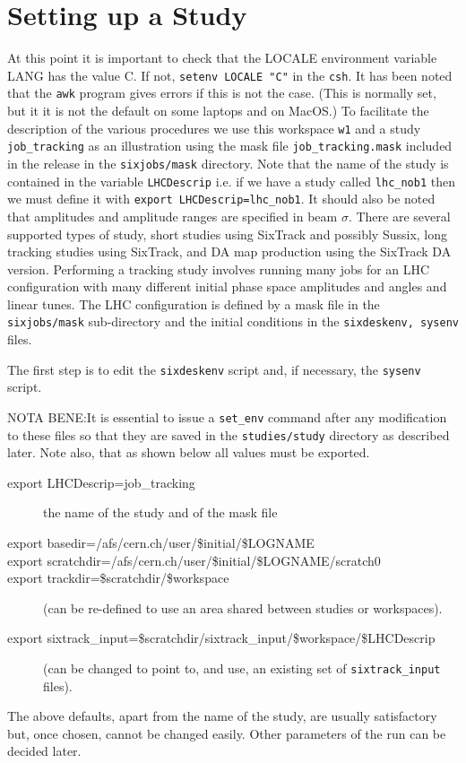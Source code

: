 \documentclass{cernatsnote}    %
\begin{document}
\section{Setting up a Study}
\label{sec:study}
At this point it is important to check that the LOCALE environment variable
LANG has the value C. If not, {\tt setenv LOCALE "C"} in the {\tt csh}.
It has been noted that the {\tt awk} program gives errors if this is not the
case. (This is normally set, but it it is not the default on some laptops
and on MacOS.)
To facilitate the description of the various procedures we use this workspace
{\tt w1} and a study {\tt job\_tracking} as an illustration using the mask
file {\tt job\_tracking.mask} included in the release in the {\tt sixjobs/mask}
directory. Note that the name of the
study is contained in the variable {\tt LHCDescrip} i.e. if we have a study
called {\tt lhc\_nob1} then we must define it 
with {\tt export LHCDescrip=lhc\_nob1}. It should also be noted that amplitudes
and amplitude ranges are specified in beam $\sigma$.
There are several supported types of study, short studies using SixTrack and possibly
Sussix, long tracking studies using SixTrack, and DA map production using the SixTrack DA version.
Performing a tracking study involves running many jobs for an LHC configuration with
many different initial phase space amplitudes and angles and linear tunes. The LHC configuration is
defined by a mask file in the {\tt sixjobs/mask} sub-directory and the initial
conditions in the {\tt sixdeskenv, sysenv} files.

The first step is to edit the {\tt sixdeskenv} script and, if necessary, 
the {\tt sysenv} script.

NOTA BENE:It is essential to issue
a {\tt set\_env} command after any modification to these files so that 
they are saved in the {\tt studies/study} directory as described later.
Note also, that as shown below all values must be exported.

\begin{description}
\item [export LHCDescrip=job\_tracking] the name of the study and of the mask file
\item [export basedir=/afs/cern.ch/user/\$initial/\$LOGNAME]
\item [export scratchdir=/afs/cern.ch/user/\$initial/\$LOGNAME/scratch0]
\item [export trackdir=\$scratchdir/\$workspace]
(can be re-defined to use an area shared between studies or workspaces).
\item [export sixtrack\_input=\$scratchdir/sixtrack\_input/\$workspace/\$LHCDescrip]
(can be changed to point to, and use, an existing set of {\tt sixtrack\_input} files).
\end{description}
The above defaults, apart from the name of the study,
are usually satisfactory but, once chosen,
cannot be changed easily. Other parameters of the run can be decided later.
\end{document}
